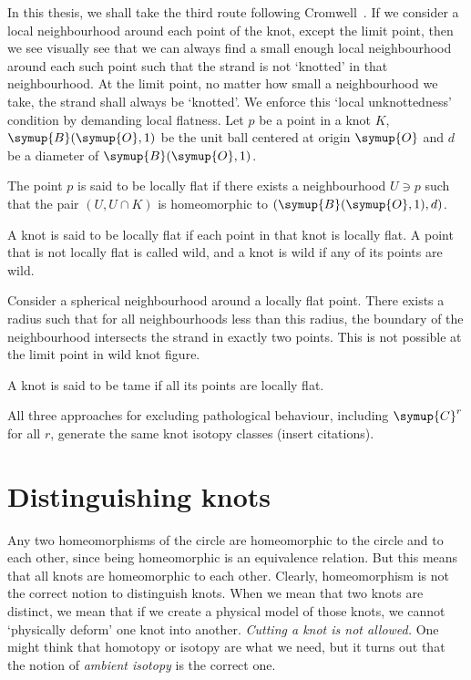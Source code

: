 In this thesis, we shall take the third route following Cromwell~\cite[chp.~1]{cromwell}. If we consider a local neighbourhood around each point of the knot, except the limit point, then we see visually see that we can always find a small enough local neighbourhood around each such point such that the strand is not `knotted' in that neighbourhood. At the limit point, no matter how small a neighbourhood we take, the strand shall always be `knotted'. We enforce this `local unknottedness' condition by demanding local flatness. Let \(p\) be a point in a knot \(K\), \(\symup{B}(\symup{O}, 1)\) be the unit ball centered at origin \(\symup{O}\) and \(d\) be a diameter of \(\symup{B}(\symup{O}, 1)\).
\begin{defn}
    The point \(p\) is said to be locally flat if there exists a neighbourhood \(U \ni p\) such that the pair \((U, U \cap K)\) is homeomorphic to \((\symup{B}(\symup{O}, 1), d)\).

    A knot is said to be locally flat if each point in that knot is locally flat. A point that is not locally flat is called wild, and a knot is wild if any of its points are wild.
\end{defn}

Consider a spherical neighbourhood around a locally flat point. There exists a radius such that for all neighbourhoods less than this radius, the boundary of the neighbourhood intersects the strand in exactly two points. This is not possible at the limit point in wild knot figure.

\begin{defn}
    A knot is said to be tame if all its points are locally flat.
\end{defn}

\begin{remark}
    All three approaches for excluding pathological behaviour, including \(\symup{C}^r\) for all \(r\), generate the same knot isotopy classes (insert citations).
\end{remark}


\section{Distinguishing knots}

Any two homeomorphisms of the circle are homeomorphic to the circle and to each other, since being homeomorphic is an equivalence relation. But this means that all knots are homeomorphic to each other. Clearly, homeomorphism is not the correct notion to distinguish knots. When we mean that two knots are distinct, we mean that if we create a physical model of those knots, we cannot `physically deform' one knot into another. \textit{Cutting a knot is not allowed.} One might think that homotopy or isotopy are what we need, but it turns out that the notion of \textit{ambient isotopy} is the correct one.

